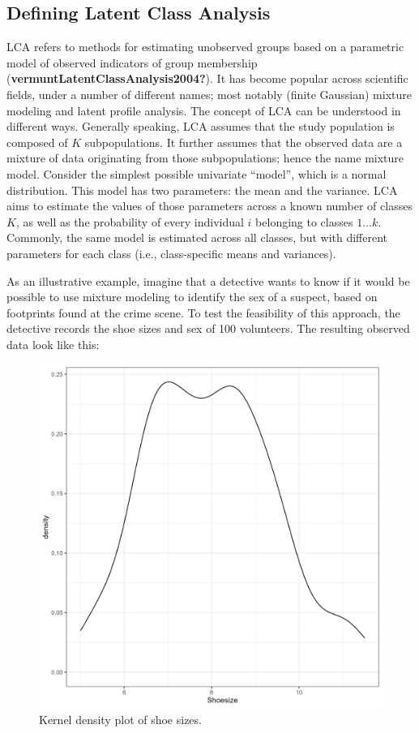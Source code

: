 \documentclass[
  ,man,floatsintext]{apa6}
\begin{document}
\hypertarget{defining-latent-class-analysis}{%
\subsection{Defining Latent Class Analysis}\label{defining-latent-class-analysis}}

LCA refers to methods for estimating unobserved groups based on a
parametric model of observed indicators of group membership
(\textbf{vermuntLatentClassAnalysis2004?}). It has become popular across
scientific fields, under a number of different names; most notably
(finite Gaussian) mixture modeling and latent profile analysis. The
concept of LCA can be understood in different ways. Generally speaking,
LCA assumes that the study population is composed of \(K\) subpopulations.
It further assumes that the observed data are a mixture of data
originating from those subpopulations; hence the name mixture model.
Consider the simplest possible univariate ``model'', which is a normal
distribution. This model has two parameters: the mean and the variance.
LCA aims to estimate the values of those parameters across a known
number of classes \(K\), as well as the probability of every individual
\(i\) belonging to classes \(1 \ldots k\). Commonly, the same model is
estimated across all classes, but with different parameters for each
class (i.e., class-specific means and variances).

As an illustrative example, imagine that a detective wants to know if it
would be possible to use mixture modeling to identify the sex of a
suspect, based on footprints found at the crime scene. To test the
feasibility of this approach, the detective records the shoe sizes and
sex of 100 volunteers. The resulting observed data look like this:

\begin{figure}
\includegraphics[width=7in]{shoedens} \caption{Kernel density plot of shoe sizes.}\label{fig:shoedens}
\end{figure}
\end{document}

